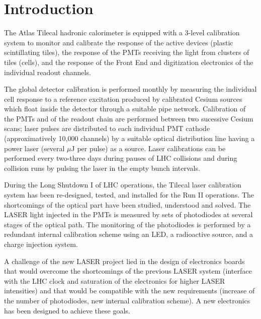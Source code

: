 \documentclass[UKenglish,texlive=2013]{\ATLASLATEXPATH atlasdoc}
\begin{document}
\maketitle

\tableofcontents


\section{Introduction}
\label{sec:intro}

The Atlas Tilecal hadronic calorimeter is equipped with a 3-level calibration system to monitor and  calibrate the response of the active devices (plastic scintillating tiles), the response of the PMTs receiving the light from clusters of tiles (cells), and the response of the Front End and digitization electronics of the individual readout channels. \par
The global detector calibration is performed monthly by measuring the individual cell response to a reference excitation produced by calibrated Cesium sources which float inside the detector through a suitable pipe network.
Calibration of the PMTs and of the readout chain are performed between two sucessive Cesium scans; laser pulses are distributed to each individual PMT cathode (approximatively 10,000 channels) by a suitable optical distribution line having a power laser (several $\mu$J per pulse) as a source. Laser calibrations can be performed every two-three days during pauses of LHC collisions and during collision runs by pulsing the laser in the empty bunch intervals.  \par
During the Long Shutdown I of LHC operations, the Tilecal laser calibration system has been re-designed, tested, and installed for the Run II operations. The shortcomings of the optical part have been studied, understood and solved. The LASER light injected in the PMTs is measured by sets of photodiodes at several stages of the optical path. The monitoring of the photodiodes is performed by a redundant internal calibration scheme using an LED, a radioactive source, and a charge injection system. \par
A challenge of the new LASER project lied in the design of electronics boards that would overcome the shortcomings of the previous LASER system (interface with the LHC clock and saturation of the electronics for higher LASER intensities) and that would be compatible with the new requirements (increase of the number of photodiodes, new internal calibration scheme). A new electronics has been designed to achieve these goals.
\end{document}
